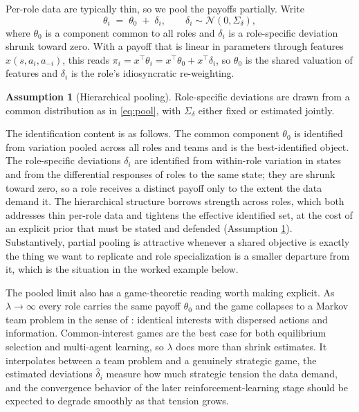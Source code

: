 \documentclass[11pt]{article}
\theoremstyle{definition}
\newtheorem{assumption}{Assumption}
\begin{document}
Per-role data are typically thin, so we pool the payoffs partially. Write
\begin{equation}
\theta_i \;=\; \theta_0 \;+\; \delta_i,
\qquad
\delta_i \sim \mathcal{N}(0,\Sigma_\delta),
\label{eq:pool}
\end{equation}
where $\theta_0$ is a component common to all roles and $\delta_i$ is a role-specific deviation shrunk toward zero. With a payoff that is linear in parameters through features $x(s,a_i,a_{-i})$, this reads $\pi_i = x^\top\theta_i = x^\top\theta_0 + x^\top\delta_i$, so $\theta_0$ is the shared valuation of features and $\delta_i$ is the role's idiosyncratic re-weighting.

\begin{assumption}[Hierarchical pooling]
\label{ass:pool}
Role-specific deviations are drawn from a common distribution as in \eqref{eq:pool}, with $\Sigma_\delta$ either fixed or estimated jointly.
\end{assumption}

The identification content is as follows. The common component $\theta_0$ is identified from variation pooled across all roles and teams and is the best-identified object. The role-specific deviations $\delta_i$ are identified from within-role variation in states and from the differential responses of roles to the same state; they are shrunk toward zero, so a role receives a distinct payoff only to the extent the data demand it. The hierarchical structure borrows strength across roles, which both addresses thin per-role data and tightens the effective identified set, at the cost of an explicit prior that must be stated and defended (Assumption \ref{ass:pool}). Substantively, partial pooling is attractive whenever a shared objective is exactly the thing we want to replicate and role specialization is a smaller departure from it, which is the situation in the worked example below.

The pooled limit also has a game-theoretic reading worth making explicit. As $\lambda \to \infty$ every role carries the same payoff $\theta_0$ and the game collapses to a Markov team problem in the sense of \citet{marschakRadner1972}: identical interests with dispersed actions and information. Common-interest games are the best case for both equilibrium selection and multi-agent learning, so $\lambda$ does more than shrink estimates. It interpolates between a team problem and a genuinely strategic game, the estimated deviations $\hat\delta_i$ measure how much strategic tension the data demand, and the convergence behavior of the later reinforcement-learning stage should be expected to degrade smoothly as that tension grows.
\end{document}

